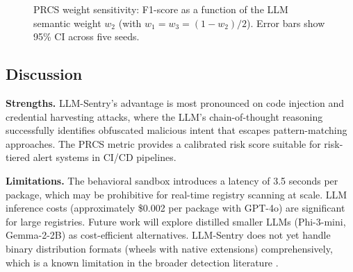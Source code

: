 \documentclass[conference]{IEEEtran}
\begin{document}
\begin{figure}[htbp]
\centering
{}
\caption{PRCS weight sensitivity: F1-score as a function of the LLM semantic weight $w_2$ (with $w_1 = w_3 = (1-w_2)/2$). Error bars show 95\% CI across five seeds.}
\label{fig:weight_sensitivity}
\end{figure}

\subsection{Discussion}

\textbf{Strengths.} LLM-Sentry's advantage is most pronounced on code injection and credential harvesting attacks, where the LLM's chain-of-thought reasoning successfully identifies obfuscated malicious intent that escapes pattern-matching approaches. The PRCS metric provides a calibrated risk score suitable for risk-tiered alert systems in CI/CD pipelines.

\textbf{Limitations.} The behavioral sandbox introduces a latency of 3.5 seconds per package, which may be prohibitive for real-time registry scanning at scale. LLM inference costs (approximately \$0.002 per package with GPT-4o) are significant for large registries. Future work will explore distilled smaller LLMs (Phi-3-mini, Gemma-2-2B) as cost-efficient alternatives. LLM-Sentry does not yet handle binary distribution formats (wheels with native extensions) comprehensively, which is a known limitation in the broader detection literature \cite{twobirdstone2024tosem}.
\end{document}
